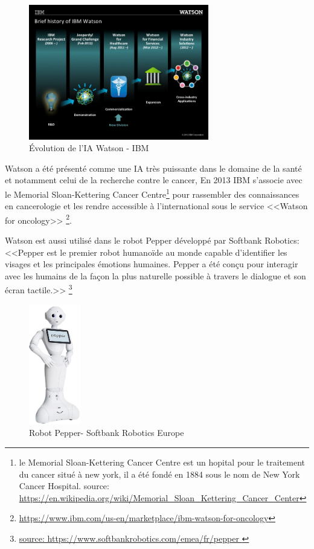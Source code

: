 \begin{figure}[H]
    \centering
    \includegraphics[width=0.7\textwidth]{Images/historyofwatson}
    \caption{Évolution de l'IA Watson - IBM}
    \label{fig:historyofwatson}
\end{figure}


Watson a été présenté comme une IA très puissante dans le domaine de la santé et notamment
celui de la recherche contre le cancer, En 2013 IBM s'associe avec
le Memorial Sloan-Kettering Cancer Centre\footnote{
    le Memorial Sloan-Kettering Cancer Centre est un hopital pour le traitement du cancer situé à new
    york, il a été fondé en 1884 sous le nom de New York Cancer Hospital. \newline
    source: \url{https://en.wikipedia.org/wiki/Memorial_Sloan_Kettering_Cancer_Center}

} pour rassembler des connaissances en
cancerologie et les rendre accessible à l'international sous le service <<Watson for oncology>>
\footnote{\url{https://www.ibm.com/us-en/marketplace/ibm-watson-for-oncology}}. \newline

Watson est aussi utilisé dans le robot Pepper développé par Softbank Robotics:
<<Pepper est le premier robot humanoïde au monde capable d'identifier les visages et
les principales émotions humaines. Pepper a été conçu pour interagir avec
les humains de la façon la plus naturelle possible à travers le dialogue et son écran tactile.>>
\footnote{\url{ source: https://www.softbankrobotics.com/emea/fr/pepper }} \newline

\begin{figure}[H]
    \centering
    \includegraphics[width=0.2\textwidth]{Images/pepper}
    \caption{Robot Pepper- Softbank Robotics Europe}
    \label{fig:pepperrobot}
\end{figure}

